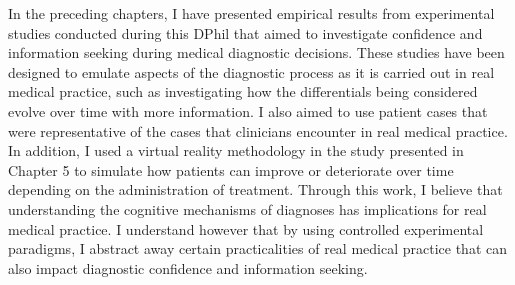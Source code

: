 \documentclass[a4paper, nobind]{templates/ociamthesis}
\begin{document}
\adjustmtc
{}

In the preceding chapters, I have presented empirical results from experimental studies conducted during this DPhil that aimed to investigate confidence and information seeking during medical diagnostic decisions. These studies have been designed to emulate aspects of the diagnostic process as it is carried out in real medical practice, such as investigating how the differentials being considered evolve over time with more information. I also aimed to use patient cases that were representative of the cases that clinicians encounter in real medical practice. In addition, I used a virtual reality methodology in the study presented in Chapter 5 to simulate how patients can improve or deteriorate over time depending on the administration of treatment. Through this work, I believe that understanding the cognitive mechanisms of diagnoses has implications for real medical practice. I understand however that by using controlled experimental paradigms, I abstract away certain practicalities of real medical practice that can also impact diagnostic confidence and information seeking.
\end{document}
